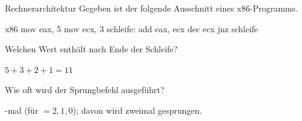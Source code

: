 \documentclass{uebungsblatt}
\begin{document}
\begin{aufgabe}{Rechnerarchitektur}
Gegeben ist der folgende Ausschnitt eines x86-Programms.

\begin{codeblock}{x86}
        mov   eax, 5
        mov   ecx, 3
schleife:
        add   eax, ecx
        dec   ecx
        jnz   schleife
\end{codeblock}

\begin{teilaufgaben}
   Welchen Wert enthält  nach Ende der Schleife?
    \begin{antworten}[spalten=4, typ=einfach]
    \end{antworten}
    \begin{loesung}
      $5 + 3 + 2 + 1 = 11$
    \end{loesung}
   Wie oft wird der Sprungbefehl  ausgeführt?
    \begin{loesung}
      -mal (für  $= 2, 1, 0$); davon wird zweimal
      gesprungen. 
    \end{loesung}
\end{teilaufgaben}
\end{aufgabe}
\end{document}
